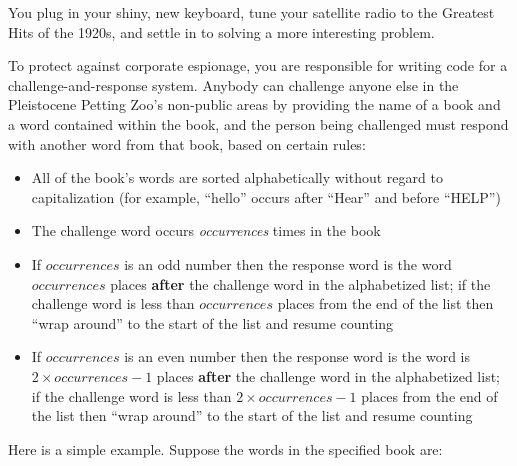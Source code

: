 You plug in your shiny, new keyboard, tune your satellite radio to the Greatest Hits of the 1920s, and settle in to solving a more interesting problem.

To protect against corporate espionage, you are responsible for writing code for a challenge-and-response system.
Anybody can challenge anyone else in the Pleistocene Petting Zoo's non-public areas by providing the name of a book and a word contained within the book, and the person being challenged must respond with another word from that book, based on certain rules:
\begin{itemize}
    \item All of the book's words are sorted alphabetically without regard to capitalization (for example, ``hello'' occurs after ``Hear'' and before ``HELP'')
    \item The challenge word occurs \textit{occurrences} times in the book
    \item If $occurrences$ is an odd number then the response word is the word $occurrences$ places \textbf{after} the challenge word in the alphabetized list;
    if the challenge word is less than $occurrences$ places from the end of the list then ``wrap around'' to the start of the list and resume counting
    \item If $occurrences$ is an even number then the response word is the word is ${2 \times occurrences - 1}$ places \textbf{after} the challenge word in the alphabetized list;
    if the challenge word is less than ${2 \times occurrences - 1}$ places from the end of the list then ``wrap around'' to the start of the list and resume counting
\end{itemize}

Here is a simple example.
Suppose the words in the specified book are:

